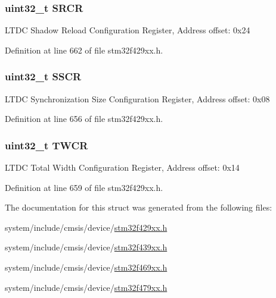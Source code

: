 \subsubsection[{\texorpdfstring{S\+R\+CR}{SRCR}}]{ uint32\+\_\+t S\+R\+CR}\hypertarget{struct_l_t_d_c___type_def_a92af0fef30467bfce8d1408f81cfda6d}{}\label{struct_l_t_d_c___type_def_a92af0fef30467bfce8d1408f81cfda6d}
L\+T\+DC Shadow Reload Configuration Register, Address offset\+: 0x24 

Definition at line 662 of file stm32f429xx.\+h.

\subsubsection[{\texorpdfstring{S\+S\+CR}{SSCR}}]{ uint32\+\_\+t S\+S\+CR}\hypertarget{struct_l_t_d_c___type_def_a3aa8cb3b286c630b9fa126616a1f6498}{}\label{struct_l_t_d_c___type_def_a3aa8cb3b286c630b9fa126616a1f6498}
L\+T\+DC Synchronization Size Configuration Register, Address offset\+: 0x08 

Definition at line 656 of file stm32f429xx.\+h.

\subsubsection[{\texorpdfstring{T\+W\+CR}{TWCR}}]{ uint32\+\_\+t T\+W\+CR}\hypertarget{struct_l_t_d_c___type_def_ace97ea64f6db802fc5488601bb8558ab}{}\label{struct_l_t_d_c___type_def_ace97ea64f6db802fc5488601bb8558ab}
L\+T\+DC Total Width Configuration Register, Address offset\+: 0x14 

Definition at line 659 of file stm32f429xx.\+h.



The documentation for this struct was generated from the following files\+:\begin{DoxyCompactItemize}
\item 
system/include/cmsis/device/\hyperlink{stm32f429xx_8h}{stm32f429xx.\+h}\item 
system/include/cmsis/device/\hyperlink{stm32f439xx_8h}{stm32f439xx.\+h}\item 
system/include/cmsis/device/\hyperlink{stm32f469xx_8h}{stm32f469xx.\+h}\item 
system/include/cmsis/device/\hyperlink{stm32f479xx_8h}{stm32f479xx.\+h}\end{DoxyCompactItemize}
